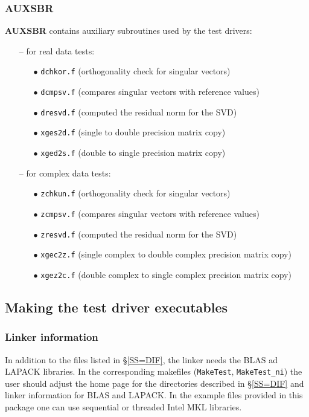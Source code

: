 \documentclass[12pt, a4paper, final]{article}
\numberwithin{equation}{section}
\begin{document}
\subsubsection{AUXSBR}
\textbf{AUXSBR} contains auxiliary subroutines used by the test drivers:
\begin{itemize}
\item[--] for real data tests:

\begin{itemize}
\item[$\bullet$] \texttt{dchkor.f} (orthogonality check for singular vectors) 
\item[$\bullet$] \texttt{dcmpsv.f} (compares singular vectors with reference values)
\item[$\bullet$] \texttt{dresvd.f} (computed the residual norm for the SVD)   
\item[$\bullet$] \texttt{xges2d.f} (single to double precision matrix copy)
\item[$\bullet$] \texttt{xged2s.f} (double to single precision matrix copy)  
\end{itemize}

\item[--] for complex data tests:
\begin{itemize}
\item[$\bullet$] \texttt{zchkun.f} (orthogonality check for singular vectors) 
\item[$\bullet$] \texttt{zcmpsv.f} (compares singular vectors with reference values)
\item[$\bullet$] \texttt{zresvd.f} (computed the residual norm for the SVD)   
\item[$\bullet$] \texttt{xgec2z.f} (single complex to double complex precision matrix copy)
\item[$\bullet$] \texttt{xgez2c.f} (double complex to single complex precision matrix copy)
\end{itemize}
\end{itemize}

\subsection{Making the test driver executables}

\subsubsection{Linker information}
In addition to the files listed in \S \ref{SS=DIF}, the linker needs the BLAS ad LAPACK libraries. 
In the corresponding makefiles (\texttt{MakeTest}, \texttt{MakeTest\_ni}) the user should 
adjust the home page for the directories described in \S \ref{SS=DIF} and linker information
for BLAS and LAPACK. In the example files provided in this package
one can use sequential or threaded Intel MKL libraries.
\end{document}
